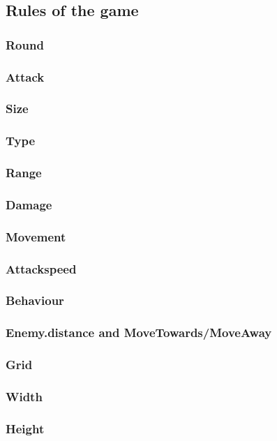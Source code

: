 		 
	\subsection{Rules of the game}
	\subsubsection{Round}
	\subsubsection{Attack}
		\subsubsection{Size}
			\subsubsection{Type}
				\subsubsection{Range}
					\subsubsection{Damage}
						\subsubsection{Movement}
							\subsubsection{Attackspeed}
								\subsubsection{Behaviour}
								\subsubsection{Enemy.distance and MoveTowards/MoveAway}
								\subsubsection{Grid}
								\subsubsection{Width}
								\subsubsection{Height}
								
																